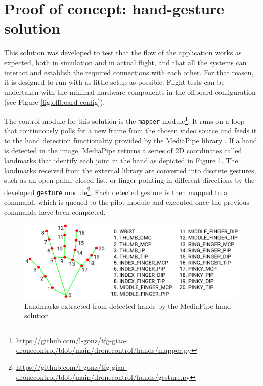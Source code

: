 \section{Proof of concept: hand-gesture solution}
\label{sec:hands}
This solution was developed to test that the flow of the application works as expected, both in simulation and in actual flight, and that all the systems can interact and establish the required connections with each other.
For that reason, it is designed to run with as little setup as possible. Flight tests can be undertaken with the minimal hardware components in the offboard configuration (see Figure \ref{fig:offboard-config}).

The control module for this solution is the \texttt{mapper} module\footnote{\url{https://github.com/l-gonz/tfg-giaa-dronecontrol/blob/main/dronecontrol/hands/mapper.py}}.
It runs on a loop that continuously polls for a new frame from the chosen video source and feeds it to the hand detection functionality provided by the MediaPipe library \cite{mp-hands-paper}. If a hand is detected in the image, MediaPipe returns a series of 2D coordinates called landmarks that identify each joint in the hand as depicted in Figure \ref{fig:hand-landmarks}.
The landmarks received from the external library are converted into discrete gestures, such as an open palm, closed fist, or finger pointing in different directions by the developed \texttt{gesture} module\footnote{\url{https://github.com/l-gonz/tfg-giaa-dronecontrol/blob/main/dronecontrol/hands/gesture.py}}. Each detected gesture is then mapped to a command, which is queued to the pilot module and executed once the previous commands have been completed.

\begin{figure}
  \centering
  \includegraphics[width=\textwidth, keepaspectratio]{img/hand_landmarks.png}
  \caption{Landmarks extracted from detected hands by the MediaPipe hand solution.}
  \label{fig:hand-landmarks}
\end{figure}

